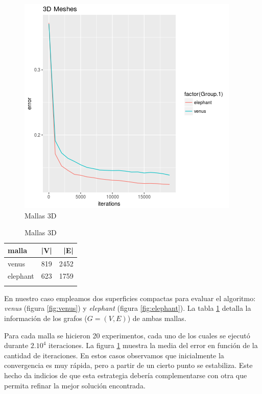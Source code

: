 \documentclass[conference,compsoc,a4paper]{IEEEtran}
\begin{document}
\begin{figure}
	\includegraphics[width=\linewidth]{3dmeshes.png} %
	\caption{Mallas 3D}%
	\label{fig:meshes} %
\end{figure}

\begin{table}
	\caption{Mallas 3D}
	\centering
	\begin{tabular}{llr}
		\toprule
		malla & |V| & |E| \\
		\midrule
		venus & 819 & 2452 \\
		elephant & 623 & 1759 \\
		\bottomrule
		\label{tab:meshes}
	\end{tabular}
\end{table}


En nuestro caso empleamos dos superficies 
compactas para evaluar el algoritmo: \emph{venus} (figura 
\ref{fig:venus}) y \emph{elephant} (figura \ref{fig:elephant}). 
La tabla \ref{tab:meshes} detalla la información de los grafos 
($G=(V,E)$) de ambas mallas.

\smallskip

Para cada malla se hicieron 20 experimentos, cada uno de los cuales se 
ejecutó durante $2.10^4$ iteraciones. La figura \ref{fig:meshes} 
muestra la media del error en función de la cantidad de iteraciones. En 
estos casos observamos que inicialmente la convergencia es muy rápida, 
pero a partir de un cierto punto se estabiliza. Este hecho da 
indicios de que esta estrategia debería complementarse con otra que 
permita refinar la mejor solución encontrada.
\end{document}
